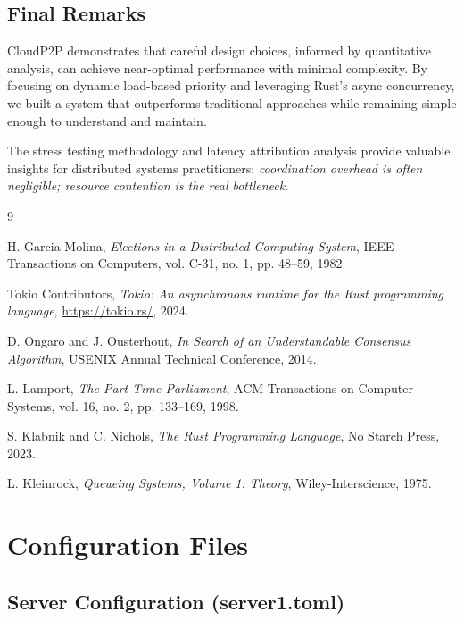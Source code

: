\documentclass[12pt,a4paper]{article}
\begin{document}
\subsection{Final Remarks}

CloudP2P demonstrates that careful design choices, informed by quantitative analysis, can achieve near-optimal performance with minimal complexity. By focusing on dynamic load-based priority and leveraging Rust's async concurrency, we built a system that outperforms traditional approaches while remaining simple enough to understand and maintain.

The stress testing methodology and latency attribution analysis provide valuable insights for distributed systems practitioners: \emph{coordination overhead is often negligible; resource contention is the real bottleneck}.

\newpage

\begin{thebibliography}{9}

H. Garcia-Molina,
\textit{Elections in a Distributed Computing System},
IEEE Transactions on Computers, vol. C-31, no. 1, pp. 48--59, 1982.

Tokio Contributors,
\textit{Tokio: An asynchronous runtime for the Rust programming language},
\url{https://tokio.rs/}, 2024.

D. Ongaro and J. Ousterhout,
\textit{In Search of an Understandable Consensus Algorithm},
USENIX Annual Technical Conference, 2014.

L. Lamport,
\textit{The Part-Time Parliament},
ACM Transactions on Computer Systems, vol. 16, no. 2, pp. 133--169, 1998.

S. Klabnik and C. Nichols,
\textit{The Rust Programming Language},
No Starch Press, 2023.

L. Kleinrock,
\textit{Queueing Systems, Volume 1: Theory},
Wiley-Interscience, 1975.

\end{thebibliography}

\newpage

\appendix

\section{Configuration Files}

\subsection{Server Configuration (server1.toml)}
\end{document}
